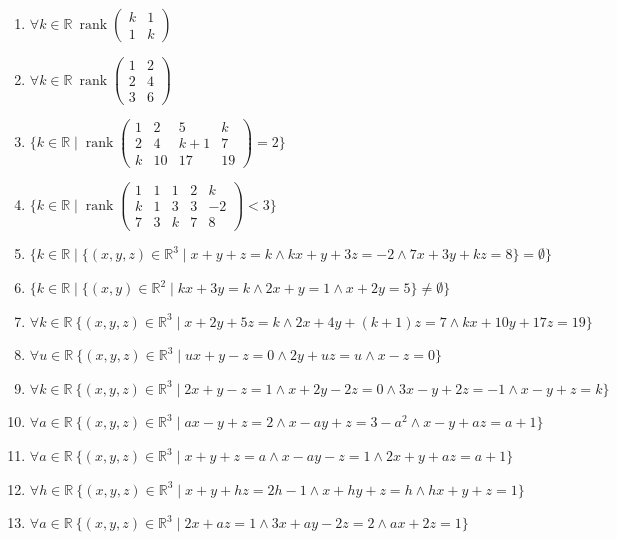 \documentclass[11pt,a4paper]{article}
\begin{document}
\begin{enumerate}
\item $\displaystyle \forall k \in \mathbb{R}\ \operatorname{rank} \begin{pmatrix} k & 1 \\ 1 & k \end{pmatrix}$
\item $\displaystyle \forall k \in \mathbb{R}\ \operatorname{rank} \begin{pmatrix} 1 & 2 \\ 2 & 4 \\ 3 & 6 \end{pmatrix}$
\item $\displaystyle \{k \in \mathbb{R} \mid \operatorname{rank} \begin{pmatrix} 1 & 2 & 5 & k \\ 2 & 4 & k + 1 & 7 \\ k & 10 & 17 & 19 \end{pmatrix} = 2\}$
\item $\displaystyle \{k \in \mathbb{R} \mid \operatorname{rank} \begin{pmatrix} 1 & 1 & 1 & 2 & k \\ k & 1 & 3 & 3 & -2 \\ 7 & 3 & k & 7 & 8 \end{pmatrix} < 3\}$
\item $\displaystyle \{k \in \mathbb{R} \mid \{(x, y, z) \in \mathbb{R}^{3} \mid x + y + z = k \land kx + y + 3z = -2 \land 7x + 3y + kz = 8\} = \emptyset\}$
\item $\displaystyle \{k \in \mathbb{R} \mid \{(x, y) \in \mathbb{R}^{2} \mid kx + 3y = k \land 2x + y = 1 \land x + 2y = 5\} \neq \emptyset\}$
\item $\displaystyle \forall k \in \mathbb{R}\ \{(x, y, z) \in \mathbb{R}^{3} \mid x + 2y + 5z = k \land 2x + 4y + (k + 1)z = 7 \land kx + 10y + 17z = 19\}$
\item $\displaystyle \forall u \in \mathbb{R}\ \{(x, y, z) \in \mathbb{R}^{3} \mid ux + y - z = 0 \land 2y + uz = u \land x - z = 0\}$
\item $\displaystyle \forall k \in \mathbb{R}\ \{(x, y, z) \in \mathbb{R}^{3} \mid 2x + y - z = 1 \land x + 2y - 2z = 0 \land 3x - y + 2z = -1 \land x - y + z = k\}$
\item $\displaystyle \forall a \in \mathbb{R}\ \{(x, y, z) \in \mathbb{R}^{3} \mid ax - y + z = 2 \land x - ay + z = 3 - a^{2} \land x - y + az = a + 1\}$
\item $\displaystyle \forall a \in \mathbb{R}\ \{(x, y, z) \in \mathbb{R}^{3} \mid x + y + z = a \land x - ay - z = 1 \land 2x + y + az = a + 1\}$
\item $\displaystyle \forall h \in \mathbb{R}\ \{(x, y, z) \in \mathbb{R}^{3} \mid x + y + hz = 2h - 1 \land x + hy + z = h \land hx + y + z = 1\}$
\item $\displaystyle \forall a \in \mathbb{R}\ \{(x, y, z) \in \mathbb{R}^{3} \mid 2x + az = 1 \land 3x + ay - 2z = 2 \land ax + 2z = 1\}$
\end{enumerate}
\end{document}
